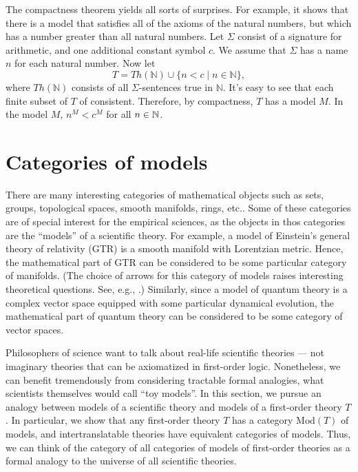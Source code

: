 \begin{disc} The compactness theorem yields all sorts of surprises.
  For example, it shows that there is a model that satisfies all of
  the axioms of the natural numbers, but which has a number greater
  than all natural numbers.  Let $\Sigma$ consist of a signature for
  arithmetic, and one additional constant symbol $c$.  We assume that
  $\Sigma$ has a name $n$ for each natural number.  Now let
  \[ T = Th(\mathbb{N}) \cup \{ n<c \mid n\in\mathbb{N} \} ,\] where
  $Th(\mathbb{N})$ consists of all $\Sigma$-sentences true in
  $\mathbb{N}$.  It's easy to see that each finite subset of $T$ of
  consistent.  Therefore, by compactness, $T$ has a model $M$.  In the
  model $M$, $n^M<c^M$ for all $n\in\mathbb N$. \end{disc}






\section{Categories of models}

There are many interesting categories of mathematical objects such as
sets, groups, topological spaces, smooth manifolds, rings, etc..  Some
of these categories are of special interest for the empirical
sciences, as the objects in thos categories are the ``models'' of a
scientific theory.  For example, a model of Einstein's general theory
of relativity (GTR) is a smooth manifold with Lorentzian metric.
Hence, the mathematical part of GTR can be considered to be some
particular category of manifolds.  (The choice of arrows for this
category of models raises interesting theoretical questions.  See,
e.g., \cite{fewster}.)  Similarly, since a model of quantum theory is
a complex vector space equipped with some particular dynamical
evolution, the mathematical part of quantum theory can be considered
to be some category of vector spaces.

Philosophers of science want to talk about real-life scientific
theories --- not imaginary theories that can be axiomatized in
first-order logic.  Nonetheless, we can benefit tremendously from
considering tractable formal analogies, what scientists themselves
would call ``toy models''.  In this section, we pursue an analogy
between models of a scientific theory and models of a first-order
theory $T$.  In particular, we show that any first-order theory $T$
has a category $\mathrm{Mod}(T)$ of models, and intertranslatable
theories have equivalent categories of models.  Thus, we can think of
the category of all categories of models of first-order theories as a
formal analogy to the universe of all scientific theories.


